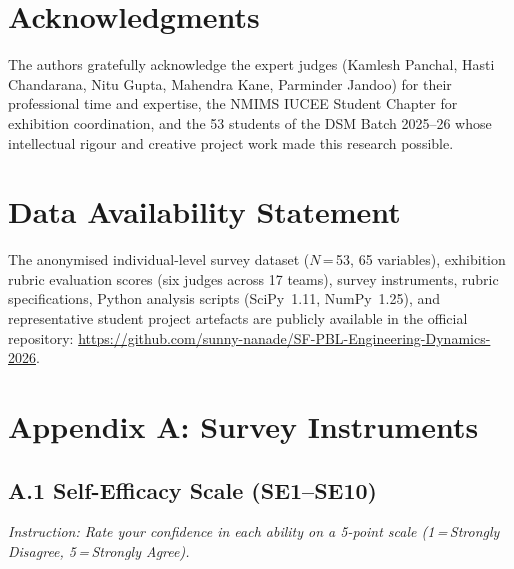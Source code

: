 \documentclass[utf8]{FrontiersinHarvard}
\begin{document}
\section*{Acknowledgments}
The authors gratefully acknowledge the expert judges (Kamlesh Panchal,
Hasti Chandarana, Nitu Gupta, Mahendra Kane, Parminder Jandoo) for their
professional time and expertise, the NMIMS IUCEE Student Chapter for
exhibition coordination, and the 53 students of the DSM Batch 2025--26
whose intellectual rigour and creative project work made this research
possible.

\section*{Data Availability Statement}
The anonymised individual-level survey dataset ($N$\,=\,53, 65 variables),
exhibition rubric evaluation scores (six judges across 17 teams), survey instruments,
rubric specifications, Python analysis scripts (SciPy~1.11, NumPy~1.25), and
representative student project artefacts are publicly available in the official
repository: \url{https://github.com/sunny-nanade/SF-PBL-Engineering-Dynamics-2026}.




\section*{Appendix A: Survey Instruments}

\subsection*{A.1 Self-Efficacy Scale (SE1--SE10)}
\textit{Instruction: Rate your confidence in each ability on a 5-point
scale (1\,=\,Strongly Disagree, 5\,=\,Strongly Agree).}
\end{document}
